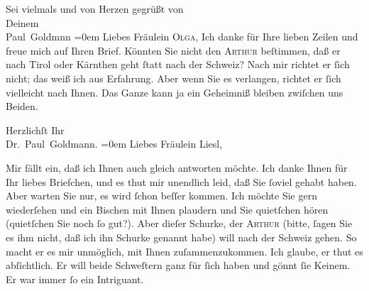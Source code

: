 \pstart
           {\pb}Sei vielmals und von Herzen gegrüßt von {\\[\baselineskip]}Deinem {\\[\baselineskip]}\spacefill\mbox{Paul Goldmnn}\pend
           \leftskip=0em{}\vspace{1em}{\vspace{1\baselineskip}}
\pstart
           Liebes Fräulein \textsc{Olga}, Ich
               danke für Ihre lieben Zeilen und freue mich auf Ihren Brief. Könnten Sie nicht den
                  \textsc{Arthur} beſtimmen, daß er nach Tirol oder Kärnthen geht
               ſtatt nach der Schweiz? Nach mir richtet er
               ſich nicht; das weiß ich aus Erfahrung. Aber wenn Sie es verlangen, richtet er ſich
               vielleicht nach Ihnen. Das Ganze kann ja ein Geheimniß bleiben zwiſchen uns  Beiden.\pend
           
\pstart
           Herzlichſt Ihr {\\[\baselineskip]}\spacefill\mbox{Dr. Paul Goldmann.}\pend
           \leftskip=0em{}\vspace{1em}{\vspace{1\baselineskip}}
\pstart
           {\pb}Liebes Fräulein Liesl,\pend
           
\pstart
           Mir fällt ein, daß ich Ihnen auch gleich antworten möchte. Ich danke Ihnen für Ihr
               liebes Briefchen, und es thut mir unendlich leid, daß Sie ſoviel \label{K_L03071-3v}\label{K_L03071-3} gehabt
               haben. Aber warten Sie nur, es wird ſchon beſſer kommen. Ich möchte Sie gern
               wiederſehen und ein Bischen mit Ihnen plaudern und Sie quietſchen hören (quietſchen
               Sie noch ſo gut?). Aber dieſer {\pb}Schurke, der \textsc{Arthur} (bitte,  ſagen Sie es ihm \strikeout{\textcolor{gray}{×}\-\textcolor{gray}{×}\-\textcolor{gray}{×}} nicht, daß ich ihn Schurke genannt habe) will nach der Schweiz gehen. So macht er es mir unmöglich, mit Ihnen
               zuſammenzukommen. Ich glaube, er thut es abſichtlich. Er will beide Schweſtern ganz
               für ſich haben und gönnt ſie Keinem. Er war immer ſo ein Intriguant.\pend
           

